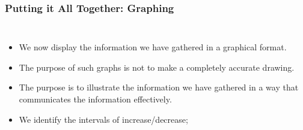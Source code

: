 \documentclass[serif,ignorenonframetext]{beamer}
\begin{document}
\begin{frame}
  \frametitle{Putting it All Together: Graphing}
  \begin{columns}
  \begin{itemize}[<+->]
  \item We now display the information we have
    gathered in a graphical format.
  \item The purpose of such graphs is not to make a
    completely accurate drawing.
  \item The purpose is to illustrate the information we
    have gathered in a way that communicates the information
    effectively.
  \item We identify the intervals of increase/decrease;
  \end{itemize}

\end{columns}
\end{frame}
\end{document}
